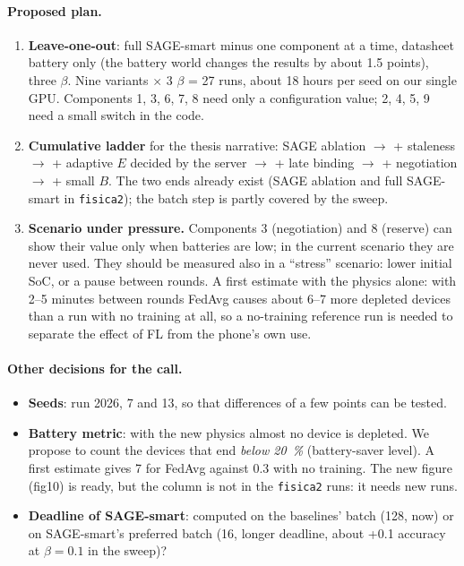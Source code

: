 \documentclass[11pt,a4paper]{article}
\begin{document}
\paragraph{Proposed plan.}
\begin{enumerate}
  \item \textbf{Leave-one-out}: full SAGE-smart minus one component at a time,
        datasheet battery only (the battery world changes the results by about
        1.5 points), three $\beta$. Nine variants $\times$ 3 $\beta$ = 27 runs,
        about 18 hours per seed on our single GPU. Components 1, 3, 6, 7, 8 need
        only a configuration value; 2, 4, 5, 9 need a small switch in the code.
  \item \textbf{Cumulative ladder} for the thesis narrative: SAGE ablation
        $\to$ + staleness $\to$ + adaptive $E$ decided by the server $\to$ +
        late binding $\to$ + negotiation $\to$ + small $B$. The two ends already
        exist (SAGE ablation and full SAGE-smart in \texttt{fisica2}); the
        batch step is partly covered by the sweep.
  \item \textbf{Scenario under pressure.} Components 3 (negotiation) and 8
        (reserve) can show their value only when batteries are low; in the
        current scenario they are never used. They should be measured also in
        a ``stress'' scenario: lower initial SoC, or a pause between rounds.
        A first estimate with the physics alone: with 2--5 minutes between
        rounds FedAvg causes about 6--7 more depleted devices than a run with
        no training at all, so a no-training reference run is needed to
        separate the effect of FL from the phone's own use.
\end{enumerate}

\paragraph{Other decisions for the call.}
\begin{itemize}
  \item \textbf{Seeds}: run 2026, 7 and 13, so that differences of a few
        points can be tested.
  \item \textbf{Battery metric}: with the new physics almost no device is
        depleted. We propose to count the devices that end \emph{below
        \SI{20}{\percent}} (battery-saver level). A first estimate gives 7 for
        FedAvg against 0.3 with no training. The new figure (fig10) is ready,
        but the column is not in the \texttt{fisica2} runs: it needs new runs.
  \item \textbf{Deadline of SAGE-smart}: computed on the baselines' batch
        (128, now) or on SAGE-smart's preferred batch (16, longer deadline,
        about +0.1 accuracy at $\beta=0.1$ in the sweep)?
\end{itemize}
\end{document}
